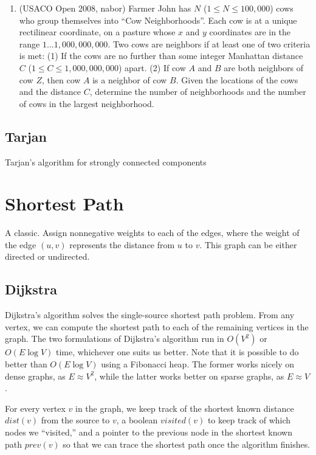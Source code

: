 \begin{enumerate}
\item
(USACO Open 2008, nabor)
Farmer John has $N$ ($1 \le N 
\le 100,000$) cows who group themselves into ``Cow
Neighborhoods''. Each cow is at a unique rectilinear coordinate, on a pasture whose $x$ and $y$ coordinates are
in the range $1\ldots1,000,000,000$. Two cows are neighbors if at least one of two criteria is met: (1) If the cows are
no further than some integer Manhattan distance $C$ ($1 \le C \le 1,000,000,000$) apart. (2) If cow $A$ and $B$ are
both neighbors of cow $Z$, then cow $A$ is a neighbor of cow $B$. Given the locations of the cows and the distance
$C$, determine the number of neighborhoods and the number of cows in the largest neighborhood.
\end{enumerate}

\subsection{Tarjan}

Tarjan's algorithm for strongly connected components

\section{Shortest Path}

A classic. Assign nonnegative weights to each of the edges, where the weight of the edge $(u,v)$ represents the distance from $u$ to $v$. This graph can be either directed or undirected.

\subsection{Dijkstra}

Dijkstra's algorithm solves the single-source shortest path problem. From any vertex, we can compute the shortest path to each of the remaining vertices in the graph. The two formulations of Dijkstra's algorithm run in $O(V^2)$ or $O(E\log{V})$ time, whichever one suits us better. Note that it is possible to do better than $O(E\log{V})$ using a Fibonacci heap. The former works nicely on dense graphs, as $E \approx V^2$, while the latter works better on sparse graphs, as $E \approx V$.

For every vertex $v$ in the graph, we keep track of the shortest known distance $dist(v)$ from the source to $v$, a boolean $visited(v)$ to keep track of which nodes we ``visited,'' and a pointer to the previous node in the shortest known path $prev(v)$ so that we can trace the shortest path once the algorithm finishes.

